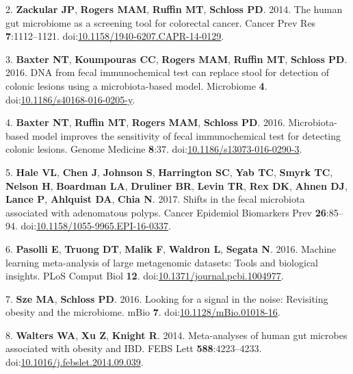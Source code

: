 \documentclass[11pt,]{article}
\begin{document}
\hypertarget{ref-zackular_human_2014}{}
2. \textbf{Zackular JP}, \textbf{Rogers MAM}, \textbf{Ruffin MT},
\textbf{Schloss PD}. 2014. The human gut microbiome as a screening tool
for colorectal cancer. Cancer Prev Res \textbf{7}:1112--1121.
doi:\href{https://doi.org/10.1158/1940-6207.CAPR-14-0129}{10.1158/1940-6207.CAPR-14-0129}.

\hypertarget{ref-baxter_dna_2016}{}
3. \textbf{Baxter NT}, \textbf{Koumpouras CC}, \textbf{Rogers MAM},
\textbf{Ruffin MT}, \textbf{Schloss PD}. 2016. DNA from fecal
immunochemical test can replace stool for detection of colonic lesions
using a microbiota-based model. Microbiome \textbf{4}.
doi:\href{https://doi.org/10.1186/s40168-016-0205-y}{10.1186/s40168-016-0205-y}.

\hypertarget{ref-baxter_microbiota-based_2016}{}
4. \textbf{Baxter NT}, \textbf{Ruffin MT}, \textbf{Rogers MAM},
\textbf{Schloss PD}. 2016. Microbiota-based model improves the
sensitivity of fecal immunochemical test for detecting colonic lesions.
Genome Medicine \textbf{8}:37.
doi:\href{https://doi.org/10.1186/s13073-016-0290-3}{10.1186/s13073-016-0290-3}.

\hypertarget{ref-hale_shifts_2017}{}
5. \textbf{Hale VL}, \textbf{Chen J}, \textbf{Johnson S},
\textbf{Harrington SC}, \textbf{Yab TC}, \textbf{Smyrk TC},
\textbf{Nelson H}, \textbf{Boardman LA}, \textbf{Druliner BR},
\textbf{Levin TR}, \textbf{Rex DK}, \textbf{Ahnen DJ}, \textbf{Lance P},
\textbf{Ahlquist DA}, \textbf{Chia N}. 2017. Shifts in the fecal
microbiota associated with adenomatous polyps. Cancer Epidemiol
Biomarkers Prev \textbf{26}:85--94.
doi:\href{https://doi.org/10.1158/1055-9965.EPI-16-0337}{10.1158/1055-9965.EPI-16-0337}.

\hypertarget{ref-pasolli_machine_2016}{}
6. \textbf{Pasolli E}, \textbf{Truong DT}, \textbf{Malik F},
\textbf{Waldron L}, \textbf{Segata N}. 2016. Machine learning
meta-analysis of large metagenomic datasets: Tools and biological
insights. PLoS Comput Biol \textbf{12}.
doi:\href{https://doi.org/10.1371/journal.pcbi.1004977}{10.1371/journal.pcbi.1004977}.

\hypertarget{ref-sze_looking_2016}{}
7. \textbf{Sze MA}, \textbf{Schloss PD}. 2016. Looking for a signal in
the noise: Revisiting obesity and the microbiome. mBio \textbf{7}.
doi:\href{https://doi.org/10.1128/mBio.01018-16}{10.1128/mBio.01018-16}.

\hypertarget{ref-walters_meta-analyses_2014}{}
8. \textbf{Walters WA}, \textbf{Xu Z}, \textbf{Knight R}. 2014.
Meta-analyses of human gut microbes associated with obesity and IBD.
FEBS Lett \textbf{588}:4223--4233.
doi:\href{https://doi.org/10.1016/j.febslet.2014.09.039}{10.1016/j.febslet.2014.09.039}.
\end{document}
